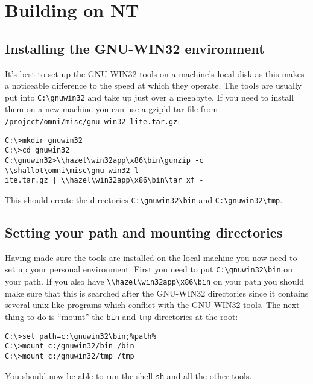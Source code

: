 \documentclass[11pt,twoside,onecolumn]{article}
\begin{document}
\section{Building on NT}

\subsection{Installing the GNU-WIN32 environment}

It's best to set up the GNU-WIN32 tools on a machine's local disk as this makes
a noticeable difference to the speed at which they operate.  The tools are
usually put into \verb|C:\gnuwin32| and take up just over a megabyte.  If you
need to install them on a new machine you can use a gzip'd tar file from
\verb|/project/omni/misc/gnu-win32-lite.tar.gz|:

{\footnotesize \begin{verbatim}
C:\>mkdir gnuwin32
C:\>cd gnuwin32
C:\gnuwin32>\\hazel\win32app\x86\bin\gunzip -c \\shallot\omni\misc\gnu-win32-l
ite.tar.gz | \\hazel\win32app\x86\bin\tar xf -
\end{verbatim}}

This should create the directories \verb|C:\gnuwin32\bin| and
\verb|C:\gnuwin32\tmp|.

\subsection{Setting your path and mounting directories}

Having made sure the tools are installed on the local machine you now need to
set up your personal environment.  First you need to put \verb|C:\gnuwin32\bin|
on your path.  If you also have \verb|\\hazel\win32app\x86\bin| on your path
you should make sure that this is searched after the GNU-WIN32 directories
since it contains several unix-like programs which conflict with the GNU-WIN32
tools.  The next thing to do is ``mount'' the {\tt bin} and {\tt tmp}
directories at the root:

{\footnotesize \begin{verbatim}
C:\>set path=c:\gnuwin32\bin;%path%
C:\>mount c:/gnuwin32/bin /bin
C:\>mount c:/gnuwin32/tmp /tmp
\end{verbatim}}

You should now be able to run the shell {\tt sh} and all the other tools.
\end{document}
